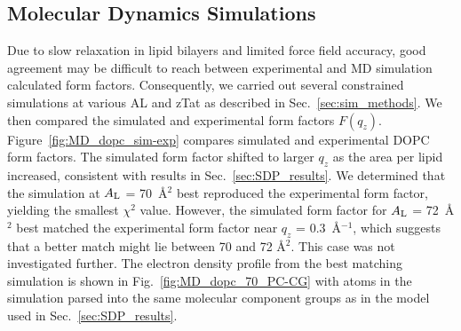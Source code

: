 
\newpage
\subsection{Molecular Dynamics Simulations}\label{sec:MD_results}
Due to slow relaxation in lipid bilayers and limited force field accuracy, 
good agreement may be difficult to reach between experimental and MD simulation 
calculated form factors. Consequently, we carried out several 
constrained simulations at various \gls{AL} and \gls{zTat} as described
in Sec.~\ref{sec:sim_methods}. 
We then compared the simulated and experimental form factors $F(q_z)$. 
Figure~\ref{fig:MD_dopc_sim-exp}  
compares simulated and experimental DOPC form factors. 
The simulated form factor
shifted to larger $q_z$ as the area per lipid increased,
consistent with results in Sec.~\ref{sec:SDP_results}. 
We determined that the simulation
at $A_\textrm{L}$ = 70~\AA$^2$ best reproduced the experimental form
factor, yielding the smallest $\chi^2$ value. 
However, the simulated form factor for $A_\textrm{L}$ = 72~\AA$^2$ best matched the experimental
form factor near $q_z$ = 0.3~\AA$^{-1}$, 
which suggests that a better match might lie between 70 and 72 \AA$^2$. 
This case was not investigated further.
The electron density profile from the best matching simulation is shown in 
Fig.~\ref{fig:MD_dopc_70_PC-CG} with atoms in the simulation parsed
into the same molecular component groups as in the model used in 
Sec.~\ref{sec:SDP_results}.

